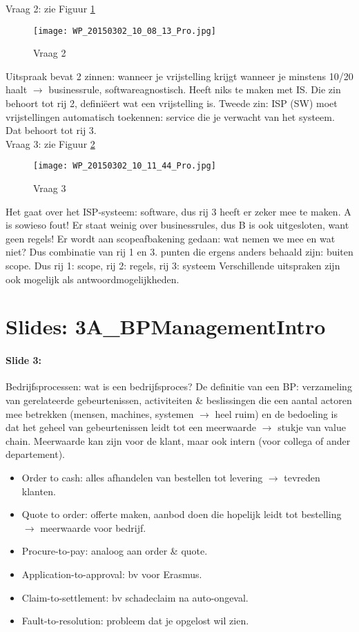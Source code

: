 \documentclass[10pt,a4paper]{report}
\begin{document}
Vraag 2: zie Figuur \ref{Les 7_Vraag 2}
\begin{figure}[ht!]
\centering
\texttt{[image: WP\_20150302\_10\_08\_13\_Pro.jpg]}
\caption{Vraag 2 \label{Les 7_Vraag 2}}
\end{figure}
Uitspraak bevat 2 zinnen: wanneer je vrijstelling krijgt wanneer je minstens 10/20 haalt $\rightarrow$ businessrule, softwareagnostisch. Heeft niks te maken met IS. Die zin behoort tot rij 2, definiëert wat een vrijstelling is.
Tweede zin: ISP (SW) moet vrijstellingen automatisch toekennen: service die je verwacht van het systeem. Dat behoort tot rij 3.\\

Vraag 3: zie Figuur \ref{Les 7_Vraag 3}
\begin{figure}[ht!]
\centering
\texttt{[image: WP\_20150302\_10\_11\_44\_Pro.jpg]}
\caption{Vraag 3 \label{Les 7_Vraag 3}}
\end{figure}
Het gaat over het ISP-systeem: software, dus rij 3 heeft er zeker mee te maken. A is sowieso fout! Er staat weinig over businessrules, dus B is ook uitgesloten, want geen regels! Er wordt aan scopeafbakening gedaan: wat nemen we mee en wat niet? Dus combinatie van rij 1 en 3. punten die ergens anders behaald zijn: buiten scope.
Dus rij 1: scope, rij 2: regels, rij 3: systeem
Verschillende uitspraken zijn ook mogelijk als antwoordmogelijkheden.

\section{Slides: 3A\_BPManagementIntro}

\paragraph{Slide 3:}Bedrijfsprocessen: wat is een bedrijfsproces? De definitie van een BP: verzameling van gerelateerde gebeurtenissen, activiteiten \& beslissingen die een aantal actoren mee betrekken (mensen, machines, systemen $\rightarrow$ heel ruim) en de bedoeling is dat het geheel van gebeurtenissen leidt tot een meerwaarde $\rightarrow$ stukje van value chain. Meerwaarde kan zijn voor de klant, maar ook intern (voor collega of ander departement).
\begin{itemize}
\item Order to cash: alles afhandelen van bestellen tot levering $\rightarrow$ tevreden klanten.
\item Quote to order: offerte maken, aanbod doen die hopelijk leidt tot bestelling $\rightarrow$ meerwaarde voor bedrijf.
\item Procure-to-pay: analoog aan order \& quote.
\item Application-to-approval: bv voor Erasmus.
\item Claim-to-settlement: bv schadeclaim na auto-ongeval.
\item Fault-to-resolution: probleem dat je opgelost wil zien.
\end{itemize}
\end{document}

